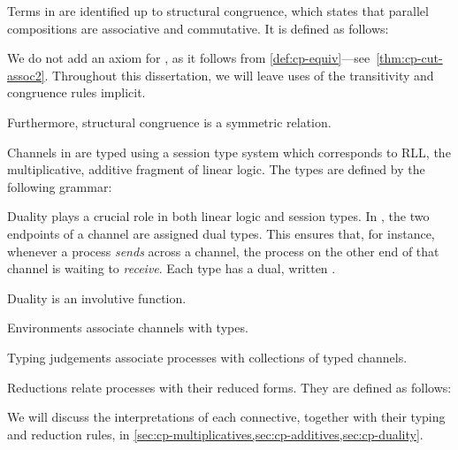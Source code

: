 Terms in \rcp are identified up to structural congruence, which states that
parallel compositions  are associative and commutative.
It is defined as follows:

We do not add an axiom for , as it follows from
\cref{def:cp-equiv}---see~\cref{thm:cp-cut-assoc2}.
Throughout this dissertation, we will leave uses of the transitivity and
congruence rules implicit.

Furthermore, structural congruence is a symmetric relation.

%
Channels in \rcp are typed using a session type system which corresponds to RLL,
the multiplicative, additive fragment of linear logic.
The types are defined by the following grammar:

Duality plays a crucial role in both linear logic and session types.
In \rcp, the two endpoints of a channel are assigned dual types.
This ensures that, for instance, whenever a process \emph{sends} across a
channel, the process on the other end of that channel is waiting to
\emph{receive}.
Each type  has a dual, written .

Duality is an involutive function.

%
Environments associate channels with types.

Typing judgements associate processes with collections of typed channels.


Reductions relate processes with their reduced forms.
They are defined as follows:



We will discuss the interpretations of each connective, together with their
typing and reduction rules, in \cref{sec:cp-multiplicatives,sec:cp-additives,sec:cp-duality}.

